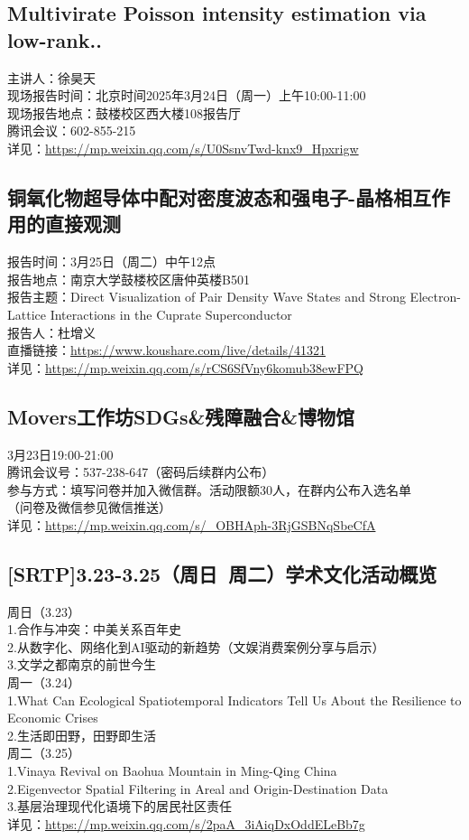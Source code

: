 \documentclass[letterpaper, 12pt]{article}
\begin{document}
\begin{multicols}{2}
\subsection{Multivirate Poisson intensity estimation via low-rank..}
主讲人：徐昊天
\\现场报告时间：北京时间2025年3月24日（周一）上午10:00-11:00
\\现场报告地点：鼓楼校区西大楼108报告厅
\\腾讯会议：602-855-215
\\详见：\url{https://mp.weixin.qq.com/s/U0SsnvTwd-knx9_Hpxrigw}

\subsection{铜氧化物超导体中配对密度波态和强电子-晶格相互作用的直接观测}
报告时间：3月25日（周二）中午12点
\\报告地点：南京大学鼓楼校区唐仲英楼B501
\\报告主题：Direct Visualization of Pair Density Wave States and Strong Electron-Lattice Interactions in the Cuprate Superconductor
\\报告人：杜增义
\\直播链接：\url{https://www.koushare.com/live/details/41321}
\\详见：\url{https://mp.weixin.qq.com/s/rCS6SfVny6komub38ewFPQ}

\subsection{Movers工作坊SDGs\&残障融合\&博物馆}
3月23日19:00-21:00\\
腾讯会议号：537-238-647（密码后续群内公布）
\\参与方式：填写问卷并加入微信群。活动限额30人，在群内公布入选名单
\\（问卷及微信参见微信推送）
\\详见：\url{https://mp.weixin.qq.com/s/_OBHAph-3RjGSBNqSbeCfA}

\subsection{[SRTP]3.23-3.25（周日~周二）学术文化活动概览}
周日（3.23）\\
1.合作与冲突：中美关系百年史\\
2.从数字化、网络化到AI驱动的新趋势（文娱消费案例分享与启示）\\
3.文学之都南京的前世今生\\
周一（3.24）\\
1.What Can Ecological Spatiotemporal Indicators Tell Us About the Resilience to Economic Crises\\
2.生活即田野，田野即生活\\
周二（3.25）\\
1.Vinaya Revival on Baohua Mountain in Ming-Qing China\\
2.Eigenvector Spatial Filtering in Areal and Origin-Destination Data\\
3.基层治理现代化语境下的居民社区责任\\
详见：\url{https://mp.weixin.qq.com/s/2paA_3iAiqDxOddELeBb7g}



\end{multicols}
\end{document}

